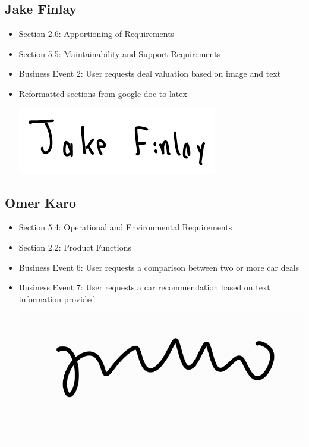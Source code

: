 \documentclass[]{article}
\begin{document}
\subsection{Jake Finlay}
\begin{itemize}
    \item Section 2.6: Apportioning of Requirements
    \item Section 5.5: Maintainability and Support Requirements
    \item Business Event 2: User requests deal valuation based on image and text
    \item Reformatted sections from google doc to latex
    \begin{center}
        \includegraphics[scale=0.7]{Images/jake.png}
    \end{center}
\end{itemize}

\subsection{Omer Karo}
\begin{itemize}
    \item {Section 5.4:} Operational and Environmental Requirements
    \item {Section 2.2:} Product Functions
    \item {Business Event 6:} User requests a comparison between two or more car deals
    \item {Business Event 7:} User requests a car recommendation based on text information provided 
    \begin{center}
        \includegraphics[scale=2]{Images/omer.jpg}
    \end{center}
\end{itemize}
\end{document}
